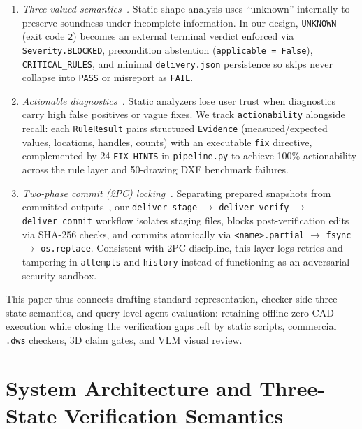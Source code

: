 \documentclass[nocopyright,nolists,upint,varvw,hyphenate]{asmejour}
\begin{document}
\begin{enumerate}
\item \emph{Three-valued semantics~\cite{sagiv2002parametric}.} Static shape analysis uses ``unknown'' internally to preserve soundness under incomplete information. In our design, \texttt{UNKNOWN} (exit code \texttt{2}) becomes an external terminal verdict enforced via \texttt{Severity.BLOCKED}, precondition abstention (\texttt{applicable = False}), \texttt{CRITICAL\_RULES}, and minimal \texttt{delivery.json} persistence so skips never collapse into \texttt{PASS} or misreport as \texttt{FAIL}.

\item \emph{Actionable diagnostics~\cite{sadowski2018lessons}.} Static analyzers lose user trust when diagnostics carry high false positives or vague fixes. We track \texttt{actionability} alongside recall: each \texttt{RuleResult} pairs structured \texttt{Evidence} (measured/expected values, locations, handles, counts) with an executable \texttt{fix} directive, complemented by 24 \texttt{FIX\_HINTS} in \texttt{pipeline.py} to achieve 100\% actionability across the rule layer and 50-drawing DXF benchmark failures.

\item \emph{Two-phase commit (2PC) locking~\cite{gray2006consensus}.} Separating prepared snapshots from committed outputs~\cite{gray2006consensus}, our \texttt{deliver\_stage} $\to$ \texttt{deliver\_verify} $\to$ \texttt{deliver\_commit} workflow isolates staging files, blocks post-verification edits via SHA-256 checks, and commits atomically via \texttt{<name>.partial} $\to$ \texttt{fsync} $\to$ \texttt{os.replace}. Consistent with 2PC discipline, this layer logs retries and tampering in \texttt{attempts} and \texttt{history} instead of functioning as an adversarial security sandbox.
\end{enumerate}

This paper thus connects drafting-standard representation, checker-side three-state semantics, and query-level agent evaluation: retaining offline zero-CAD execution while closing the verification gaps left by static scripts, commercial \texttt{.dws} checkers, 3D claim gates, and VLM visual review.

\section{System Architecture and Three-State Verification Semantics}\label{sec:arch}
\end{document}
